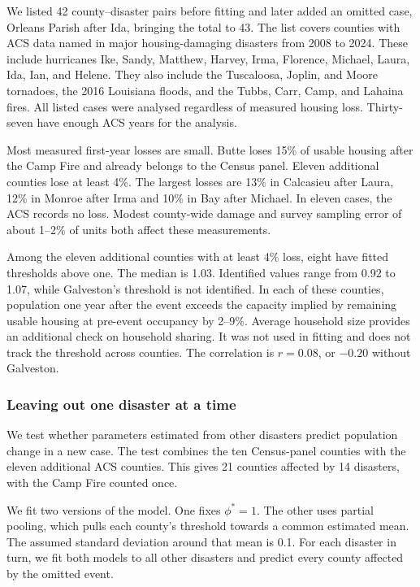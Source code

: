 \documentclass[11pt]{article}
\begin{document}
We listed 42 county--disaster pairs before fitting and later added an omitted case, Orleans Parish after Ida, bringing the total to 43. The list covers counties with ACS data named in major housing-damaging disasters from 2008 to 2024. These include hurricanes Ike, Sandy, Matthew, Harvey, Irma, Florence, Michael, Laura, Ida, Ian, and Helene. They also include the Tuscaloosa, Joplin, and Moore tornadoes, the 2016 Louisiana floods, and the Tubbs, Carr, Camp, and Lahaina fires. All listed cases were analysed regardless of measured housing loss. Thirty-seven have enough ACS years for the analysis.

Most measured first-year losses are small. Butte loses 15\% of usable housing after the Camp Fire and already belongs to the Census panel. Eleven additional counties lose at least 4\%. The largest losses are 13\% in Calcasieu after Laura, 12\% in Monroe after Irma and 10\% in Bay after Michael. In eleven cases, the ACS records no loss. Modest county-wide damage and survey sampling error of about 1--2\% of units both affect these measurements.

Among the eleven additional counties with at least 4\% loss, eight have fitted thresholds above one. The median is 1.03. Identified values range from 0.92 to 1.07, while Galveston's threshold is not identified. In each of these counties, population one year after the event exceeds the capacity implied by remaining usable housing at pre-event occupancy by 2--9\%. Average household size provides an additional check on household sharing. It was not used in fitting and does not track the threshold across counties. The correlation is $r=0.08$, or $-0.20$ without Galveston.

\subsubsection{Leaving out one disaster at a time}
We test whether parameters estimated from other disasters predict population change in a new case. The test combines the ten Census-panel counties with the eleven additional ACS counties. This gives 21 counties affected by 14 disasters, with the Camp Fire counted once.

We fit two versions of the model. One fixes $\phi^*=1$. The other uses partial pooling, which pulls each county's threshold towards a common estimated mean. The assumed standard deviation around that mean is 0.1. For each disaster in turn, we fit both models to all other disasters and predict every county affected by the omitted event.
\end{document}

